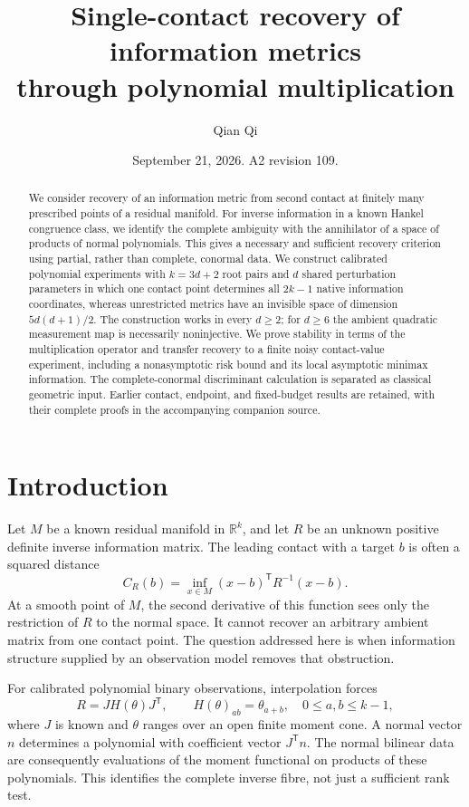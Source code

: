 \documentclass[11pt,reqno]{amsart}
\title[Single-contact recovery of information metrics]{Single-contact recovery of information metrics\\through polynomial multiplication}
\author{Qian Qi}
\date{September 21, 2026. A2 revision 109.}
\numberwithin{equation}{section}
\theoremstyle{definition}\newtheorem{definition}[theorem]{Definition}
\theoremstyle{remark}\newtheorem{remark}[theorem]{Remark}
\newcommand{\R}{\mathbb R}
\begin{document}
\begin{abstract}
We consider recovery of an information metric from second contact at finitely many prescribed points of a residual manifold. For inverse information in a known Hankel congruence class, we identify the complete ambiguity with the annihilator of a space of products of normal polynomials. This gives a necessary and sufficient recovery criterion using partial, rather than complete, conormal data. We construct calibrated polynomial experiments with $k=3d+2$ root pairs and $d$ shared perturbation parameters in which one contact point determines all $2k-1$ native information coordinates, whereas unrestricted metrics have an invisible space of dimension $5d(d+1)/2$. The construction works in every $d\ge2$; for $d\ge6$ the ambient quadratic measurement map is necessarily noninjective. We prove stability in terms of the multiplication operator and transfer recovery to a finite noisy contact-value experiment, including a nonasymptotic risk bound and its local asymptotic minimax information. The complete-conormal discriminant calculation is separated as classical geometric input. Earlier contact, endpoint, and fixed-budget results are retained, with their complete proofs in the accompanying companion source.
\end{abstract}
\maketitle

\section{Introduction}
Let $M$ be a known residual manifold in $\R^k$, and let $R$ be an unknown positive definite inverse information matrix. The leading contact with a target $b$ is often a squared distance
\begin{equation}\label{eq:distance}
 C_R(b)=\inf_{x\in M}(x-b)^{\mathsf T}R^{-1}(x-b).
\end{equation}
At a smooth point of $M$, the second derivative of this function sees only the restriction of $R$ to the normal space. It cannot recover an arbitrary ambient matrix from one contact point. The question addressed here is when information structure supplied by an observation model removes that obstruction.

For calibrated polynomial binary observations, interpolation forces
\begin{equation}\label{eq:intro-hankel}
 R=JH(\theta)J^{\mathsf T},\qquad H(\theta)_{ab}=\theta_{a+b},\quad 0\le a,b\le k-1,
\end{equation}
where $J$ is known and $\theta$ ranges over an open finite moment cone. A normal vector $n$ determines a polynomial with coefficient vector $J^{\mathsf T}n$. The normal bilinear data are consequently evaluations of the moment functional on products of these polynomials. This identifies the complete inverse fibre, not just a sufficient rank test.
\end{document}
